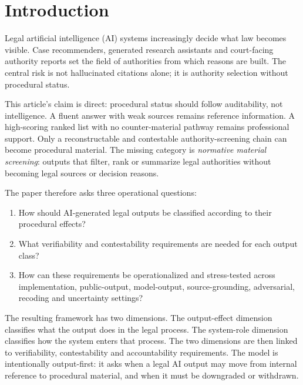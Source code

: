 \documentclass[12pt,a4paper]{article}
\begin{document}
\section{Introduction}

Legal artificial intelligence (AI) systems increasingly decide what law becomes visible. Case recommenders, generated research assistants and court-facing authority reports set the field of authorities from which reasons are built. The central risk is not hallucinated citations alone; it is authority selection without procedural status.

This article's claim is direct: procedural status should follow auditability, not intelligence. A fluent answer with weak sources remains reference information. A high-scoring ranked list with no counter-material pathway remains professional support. Only a reconstructable and contestable authority-screening chain can become procedural material. The missing category is \textit{normative material screening}: outputs that filter, rank or summarize legal authorities without becoming legal sources or decision reasons.

The paper therefore asks three operational questions:

\begin{enumerate}[label=RQ\arabic*:]
\item How should AI-generated legal outputs be classified according to their procedural effects?
\item What verifiability and contestability requirements are needed for each output class?
\item How can these requirements be operationalized and stress-tested across implementation, public-output, model-output, source-grounding, adversarial, recoding and uncertainty settings?
\end{enumerate}

The resulting framework has two dimensions. The output-effect dimension classifies what the output does in the legal process. The system-role dimension classifies how the system enters that process. The two dimensions are then linked to verifiability, contestability and accountability requirements. The model is intentionally output-first: it asks when a legal AI output may move from internal reference to procedural material, and when it must be downgraded or withdrawn.
\end{document}
